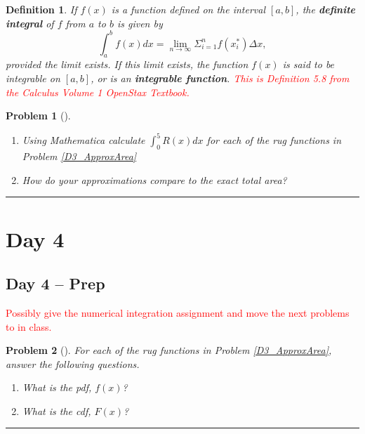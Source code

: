 \documentclass[letterpaper,oneside]{book}%
\theoremstyle{plain}
\theoremstyle{box}
\newtheorem{definition}[theorem]{Definition}
\theoremstyle{problem}
\newtheorem{problemnum}{Problem}[chapter]
\newenvironment{problem}[1][]{\begin{problemnum}[#1]}{\end{problemnum}\nopagebreak\hrule\bigskip}
\begin{document}
\begin{definition}
If $f(x)$ is a function defined on the interval $[a,b]$, the \textbf{definite integral} of $f$ from $a$ to $b$ is given by $$\int_a^b f(x)dx = \lim_{n \rightarrow \infty} \Sigma_{i=1}^n f(x_i^{*})\Delta x,$$ provided the limit exists. If this limit exists, the function $f(x)$ is said to be integrable on $[a,b]$, or is an \textbf{integrable function}.
\textcolor{red}{This is Definition 5.8 from the Calculus Volume 1 OpenStax Textbook.}
\end{definition}

\begin{problem}
\label{D3_totArea}
\begin{enumerate}
\item Using Mathematica calculate $\int_0^5 R(x) dx$ for each of the rug functions in Problem \ref{D3_ApproxArea}
\item How do your approximations compare to the exact total area?
\end{enumerate}
\end{problem}





\section{Day 4}
\subsection{Day 4 -- Prep}
\textcolor{red}{Possibly give the numerical integration assignment and move the next problems to in class.}
\begin{problem}
\label{D4_FTC}
For each of the rug functions in Problem \ref{D3_ApproxArea}, answer the following questions.
\begin{enumerate}
\item What is the pdf, $f(x)$?
\item What is the cdf, $F(x)$?
\end{enumerate}
\end{problem}
\end{document}
